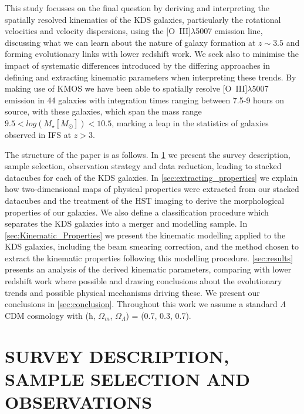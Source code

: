 \documentclass[fleqn,usenatbib]{mn2e}
\begin{document}
This study focusses on the final question by deriving and interpreting the spatially resolved kinematics of the KDS galaxies, particularly the rotational velocities and velocity dispersions, using the [O~{\sc III}]$\lambda$5007 emission line, discussing what we can learn about the nature of galaxy formation at $z \sim 3.5$ and forming evolutionary links with lower redshift work.
We seek also to minimise the impact of systematic differences introduced by the differing approaches in defining and extracting kinematic parameters when interpreting these trends.  
By making use of KMOS we have been able to spatially resolve [O~{\sc III}]$\lambda$5007 emission in 44 galaxies with integration times ranging between 7.5-9 hours on source, with these galaxies, which span the mass range $9.5 < log(M_{\star}[M_{\odot}]) < 10.5$, marking a leap in the statistics of galaxies observed in IFS at $z > 3$.

The structure of the paper is as follows. In \cref{sec:Survey_and_data} we present the survey description, sample selection, observation strategy and data reduction, leading to stacked datacubes for each of the KDS galaxies.
In \cref{sec:extracting_properties} we explain how two-dimensional maps of physical properties were extracted from our stacked datacubes and the treatment of the HST imaging to derive the morphological properties of our galaxies.
We also define a classification procedure which separates the KDS galaxies into a merger and modelling sample.
In \cref{sec:Kinematic_Properties} we present the kinematic modelling applied to the KDS galaxies, including the beam smearing correction, and the method chosen to extract the kinematic properties following this modelling procedure.
\cref{sec:results} presents an analysis of the derived kinematic parameters, comparing with lower redshift work where possible and drawing conclusions about the evolutionary trends and possible physical mechanisms driving these.
We present our conclusions in \cref{sec:conclusion}.
Throughout this work we assume a standard $\Lambda$CDM cosmology with (h, $\Omega_{m}$, $\Omega_{\Lambda}$) = (0.7, 0.3, 0.7). 

\section{SURVEY DESCRIPTION, SAMPLE SELECTION AND OBSERVATIONS}\label{sec:Survey_and_data}
\end{document}
